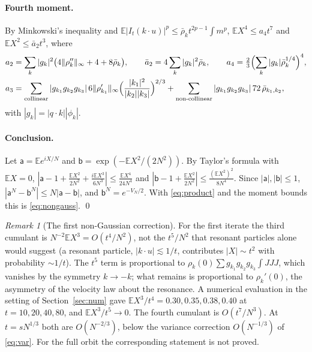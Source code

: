 \documentclass[11pt]{article}
\newcommand{\E}{\mathbb{E}}
\newcommand{\bbar}{\bar\rho}
\newcommand{\nrm}[1]{\|#1\|_\infty}
\theoremstyle{remark}
\newtheorem{remark}[theorem]{Remark}
\begin{document}
\paragraph{Fourth moment.} By Minkowski's inequality and
$\E|I_t(k\cdot u)|^p\le\bbar_kt^{2p-1}\int m^p$,
$\E X^4\le a_4t^7$ and $\E X^2\le\bar a_2t^3$, where
\begin{equation}
\begin{aligned}
  a_2&=\sum_k|g_k|^2\bigl(4\nrm{\rho_k''}+4+8\bbar_k\bigr),\qquad
  \bar a_2=4\sum_k|g_k|^2\bbar_k,\qquad
  a_4=\tfrac23\Bigl(\sum_k|g_k|\bbar_k^{1/4}\Bigr)^4,\\
  a_3&=\sum_{\rm collinear}|g_{k_1}g_{k_2}g_{k_3}|\,6\nrm{\rho_{k_1}'}
  \Bigl(\frac{|k_1|^2}{|k_2||k_3|}\Bigr)^{2/3}
  +\sum_{\rm non\text{-}collinear}|g_{k_1}g_{k_2}g_{k_3}|\,72\,
  \bbar_{k_1,k_2},
\end{aligned}
\label{eq:aconst}
\end{equation}
with $|g_k|=|q\cdot k||\phi_k|$.

\paragraph{Conclusion.} Let $\mathsf a=\E e^{iX/N}$ and
$\mathsf b=\exp(-\E X^2/(2N^2))$. By Taylor's formula with $\E X=0$,
$|\mathsf a-1+\frac{\E X^2}{2N^2}+\frac{i\E X^3}{6N^3}|\le\frac{\E X^4}{24N^4}$
and $|\mathsf b-1+\frac{\E X^2}{2N^2}|\le\frac{(\E X^2)^2}{8N^4}$. Since
$|\mathsf a|,|\mathsf b|\le1$,
$|\mathsf a^N-\mathsf b^N|\le N|\mathsf a-\mathsf b|$, and
$\mathsf b^N=e^{-V_N/2}$. With \eqref{eq:product} and the moment bounds this
is \eqref{eq:nongauss}. \qed

\begin{remark}[The first non-Gaussian correction]\label{rem:ng}
For the first iterate the third cumulant is $N^{-2}\E X^3=O(t^4/N^2)$, not
the $t^5/N^2$ that resonant particles alone would suggest (a resonant
particle, $|k\cdot u|\lesssim1/t$, contributes $|X|\sim t^2$ with
probability $\sim1/t$). The $t^5$ term is proportional to
$\rho_k(0)\sum g_{k_1}g_{k_2}g_{k_3}\int JJJ$, which vanishes by the
symmetry $k\to-k$; what remains is proportional to $\rho_k'(0)$, the
asymmetry of the velocity law about the resonance. A numerical evaluation in
the setting of Section~\ref{sec:num} gave $\E X^3/t^4=0.30,0.35,0.38,0.40$
at $t=10,20,40,80$, and $\E X^3/t^5\to0$. The fourth cumulant is
$O(t^7/N^3)$. At $t=sN^{1/3}$ both are $O(N^{-2/3})$, below the variance
correction $O(N^{-1/3})$ of \eqref{eq:var}. For the full orbit the
corresponding statement is not proved.
\end{remark}
\end{document}
